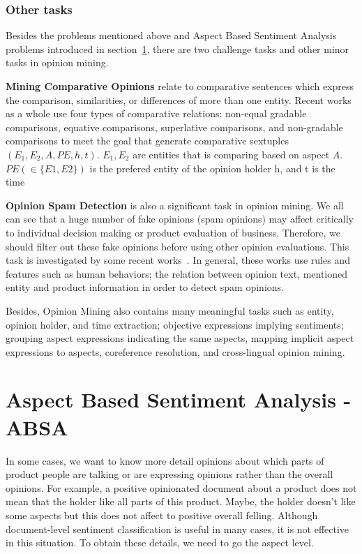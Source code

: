 \documentclass{article}
\begin{document}
\subsubsection{Other tasks}
Besides the problems mentioned above and Aspect Based Sentiment Analysis problems introduced in section~\ref{sec:sbsa}, there are two challenge tasks and other minor tasks in opinion mining.

\textbf{Mining Comparative Opinions} relate to comparative sentences which express the comparison, similarities, or differences of more than one entity.
        Recent works~\cite{Dave:2003:MPG:775152.775226,Ding:2009:EDA:1557019.1557141, Ganapathibhotla:2008:MOC:1599081.1599112,Jindal:2006:MCS:1597348.1597400} as a whole use four types of comparative relations: non-equal gradable comparisons, equative comparisons, superlative comparisons, and non-gradable comparisons to meet the goal that generate comparative sextuples $(E_1, E_2, A, PE, h, t)$.
        $E_1,E_2$ are entities that is comparing based on aspect $A$.
        $PE (\in \{E1, E2\})$ is the prefered entity of the opinion holder h, and t is the time
        
\textbf{Opinion Spam Detection} is also a significant task in opinion mining.
        We all can see that a huge number of fake opinions (spam opinions) may affect critically to individual decision making or product evaluation of business.
        Therefore, we should filter out these fake opinions before using other opinion evaluations.
        This task is investigated by some recent works~\cite{Jindal:2008:OSA:1341531.1341560,Jindal:2007:RSD:1242572.1242759,Lim:2010:DPR:1871437.1871557,Mukherjee:2011:DGR:1963192.1963240}.
        In general, these works use rules and features such as human behaviors; the relation between opinion text, mentioned entity and product information in order to detect spam opinions.
        
Besides, Opinion Mining also contains many meaningful tasks such as entity, opinion holder, and time extraction; objective expressions implying sentiments; grouping aspect expressions indicating the same aspects, mapping implicit aspect expressions to aspects, coreference resolution, and cross-lingual opinion mining.

\section{Aspect Based Sentiment Analysis - ABSA}
\label{sec:sbsa}

In some cases, we want to know more detail opinions about which parts of product people are talking or are expressing opinions rather than the overall opinions.
For example, a positive opinionated document about a product does not mean that the holder like all parts of this product.
Maybe, the holder doesn't like some aspects     but this does not affect to positive overall felling.
Although document-level sentiment classification is useful in many cases, it is not effective in this situation. 
To obtain these details, we need to go the aspect level.
\end{document}
